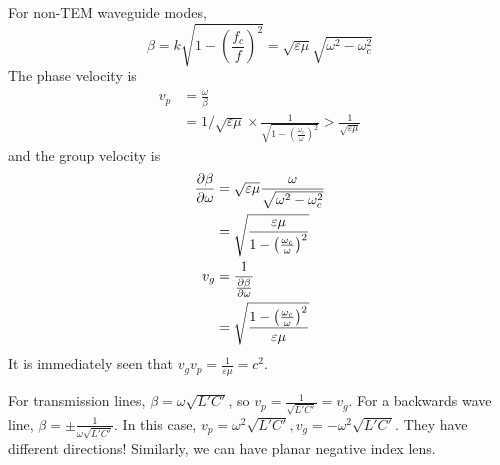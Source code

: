 \documentclass[12pt]{article}
\begin{document}
For non-TEM waveguide modes,
$$\beta = k\sqrt{1 - \left(\frac{f_c}{f}\right)^2} = \sqrt{\varepsilon\mu}\sqrt{\omega^2-\omega_c^2}$$
The phase velocity is
\begin{align*}
    v_p &= \frac{\omega}{\beta} \\
        &= 1/\sqrt{\varepsilon\mu} \times \frac{1}{\sqrt{1 - \left(\frac{\omega_c}{\omega}\right)^2}} > \frac{1}{\sqrt{\varepsilon\mu}}
\end{align*}
and the group velocity is
\begin{align*}
    \frac{\partial \beta}{\partial \omega} &= \sqrt{\varepsilon\mu} \frac{\omega}{\sqrt{\omega^2-\omega_c^2}} \\
                    &= \sqrt{\frac{\varepsilon\mu}{1 - \left(\frac{\omega_c}{\omega}\right)^2}} \\
    v_g &= \frac{1}{\frac{\partial \beta}{\partial \omega}} \\
        &= \sqrt{\frac{1 - \left(\frac{\omega_c}{\omega}\right)^2}{\varepsilon\mu}}
\end{align*}
It is immediately seen that $v_gv_p = \frac{1}{\varepsilon\mu} = c^2$.

\begin{ex}
    For transmission lines, $\beta = \omega\sqrt{L'C'}$, so $v_p = \frac{1}{\sqrt{L'C'}} = v_g$. For a backwards wave line, $\beta = \pm \frac{1}{\omega\sqrt{L'C'}}$. In this case, $v_p = \omega^2\sqrt{L'C'}, v_g = -\omega^2\sqrt{L'C'}$. They have different directions! Similarly, we can have planar negative index lens.
\end{ex}
\end{document}
